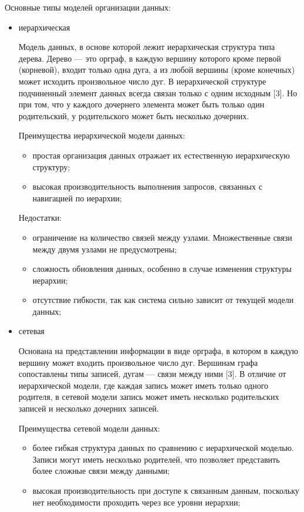 Основные типы моделей организации данных:
\begin{itemize}
	\item иерархическая
	
Модель данных, в основе которой лежит иерархическая структура типа дерева. Дерево --- это орграф, в каждую вершину которого кроме первой (корневой), входит только одна дуга, а из любой вершины (кроме конечных) может исходить произвольное число дуг. В иерархической структуре подчиненный элемент данных всегда связан только с одним исходным [3]. Но при том, что у каждого дочернего элемента может быть только один родительский, у родительского может быть несколько дочерних. 

Преимущества иерархической модели данных:
\begin{itemize}
	\item простая организация данных отражает их естественную иерархическую структуру;
	\item высокая производительность выполнения запросов, связанных с навигацией по иерархии;
\end{itemize}

Недостатки:
\begin{itemize}
	\item ограничение на количество связей между узлами. Множественные связи между двумя узлами не предусмотрены;
	\item сложность обновления данных, особенно в случае изменения структуры иерархии;
	\item отсутствие гибкости, так как система сильно зависит от текущей модели данных;
\end{itemize}

	\item сетевая
	
Основана на представлении информации в виде орграфа, в котором в каждую вершину может входить произвольное число дуг. Вершинам графа сопоставлены типы записей, дугам --- связи между ними [3]. В отличие от иерархической модели, где каждая запись может иметь только одного родителя, в сетевой модели запись может иметь несколько родительских записей и несколько дочерних записей.

Преимущества сетевой модели данных:
\begin{itemize}
	\item более гибкая структура данных по сравнению с иерархической моделью. Записи могут иметь несколько родителей, что позволяет представить более сложные связи между данными;
	\item высокая производительность при доступе к связанным данным, поскольку нет необходимости проходить через все уровни иерархии;
\end{itemize}


\end{itemize}
